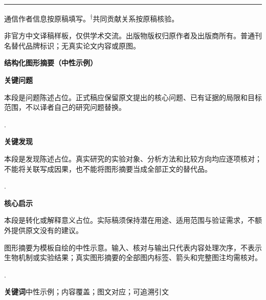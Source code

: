 \documentclass[UTF8,fontset=none,scheme=plain]{ctexart}
\newcommand{\EHJDotRule}{\par\vspace{3bp}\noindent\leaders\hbox{\kern1bp.\kern1bp}\hfill\kern0pt\par\vspace{4bp}}
\newenvironment{ehjpanel}{\par\noindent\begingroup\setlength{\fboxsep}{8bp}\begin{lrbox}{\EHJPanelBox}\begin{minipage}{\dimexpr\linewidth-16bp\relax}\sffamily}{\end{minipage}\end{lrbox}\colorbox{EHJBeige}{\usebox{\EHJPanelBox}}\endgroup\par}
\begin{document}
\vfill\noindent\rule{\textwidth}{.4bp}\par
{\fontsize{7bp}{9bp}\selectfont *通信作者信息按原稿填写。\textsuperscript{\ensuremath{\dagger}}共同贡献关系按原稿核验。\par
非官方中文译稿样板，仅供学术交流。出版物版权归原作者及出版商所有。普通刊名替代品牌标识；无真实论文内容或原图。\par}

\clearpage
\begin{ehjpanel}
\textbf{\color{EHJRed}结构化图形摘要（中性示例）}\par\vspace{14bp}
\textbf{关键问题}\par
本段是问题陈述占位。正式稿应保留原文提出的核心问题、已有证据的局限和目标范围，不以译者自己的研究问题替换。\EHJDotRule
\textbf{关键发现}\par
本段是发现陈述占位。真实研究的实验对象、分析方法和比较方向均应逐项核对；不能将关联写成因果，也不能将图形摘要当成全部正文的替代品。\EHJDotRule
\textbf{核心启示}\par
本段是转化或解释意义占位。实际稿须保持潜在用途、适用范围与验证需求，不额外提供原文没有的建议。\par\vspace{12bp}
\begin{center}\colorbox{white}{\begin{minipage}{.91\linewidth}\vspace{7bp}\DemoVector\vspace{7bp}\end{minipage}}\end{center}
{\fontsize{8bp}{10.8bp}\selectfont 图形摘要为模板自绘的中性示意。输入、核对与输出只代表内容处理次序，不表示生物机制或实验结果；真实图形摘要的全部图内标签、箭头和完整图注均需核对。}\par
\EHJDotRule
\textbf{\color{EHJRed}关键词}\quad 中性示例；内容覆盖；图文对应；可追溯引文
\end{ehjpanel}\vspace{15bp}
\begingroup\setlength{\fboxsep}{7bp}\noindent{}\endgroup
\end{document}
